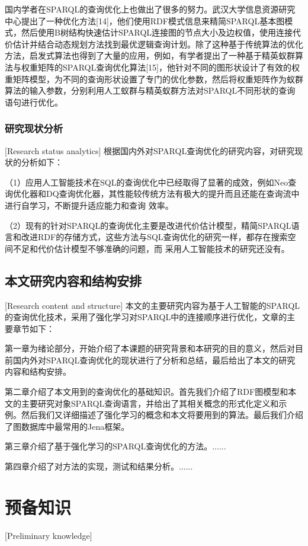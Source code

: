 国内学者在SPARQL的查询优化上也做出了很多的努力。武汉大学信息资源研究中心提出了一种优化方法[14]，他们使用RDF模式信息来精简SPARQL基本图模式，然后使用B树结构快速估计SPARQL连接图的节点大小及边权值，使用连接代价估计并结合动态规划方法找到最优逻辑查询计划。除了这种基于传统算法的优化方法，启发式算法也得到了大量的应用，例如，有学者提出了一种基于精英蚁群算法与权重矩阵的SPARQL查询优化算法[15]，他针对不同的图形状设计了有效的权重矩阵模型，为不同的查询形状设置了专门的优化参数，然后将权重矩阵作为蚁群算法的输入参数，分别利用人工蚁群与精英蚁群方法对SPARQL不同形状的查询语句进行优化。

\subsection{研究现状分析}[Research status analytics]
根据国内外对SPARQL查询优化的研究内容，对研究现状的分析如下：

（1）应用人工智能技术在SQL的查询优化中已经取得了显著的成效，例如Neo查询优化器和DQ查询优化器，其性能较传统方法有极大的提升而且还能在查询流中进行自学习，不断提升适应能力和查询
效率。

（2）现有的针对SPARQL的查询优化主要是改进代价估计模型，精简SPARQL语言和改进RDF的存储方式，这些方法与SQL查询优化的研究一样，都存在搜索空间不足和代价估计模型不够准确的问题，而
采用人工智能技术的研究还没有。


\section{本文研究内容和结构安排}[Research content and structure]
本文的主要研究内容为基于人工智能的SPARQL的查询优化技术，采用了强化学习对SPARQL中的连接顺序进行优化，文章的主要章节如下：

第一章为绪论部分，开始介绍了本课题的研究背景和本研究的目的意义，然后对目前国内外对SPARQL查询优化的现状进行了分析和总结，最后给出了本文的研究内容和结构安排。

第二章介绍了本文用到的查询优化的基础知识。首先我们介绍了RDF图模型和本文的主要研究对象SPARQL查询语言，并给出了其相关概念的形式化定义和示例。然后我们又详细描述了强化学习的概念和本文将要用到的算法。最后我们介绍了图数据库中最常用的Jena框架。

第三章介绍了基于强化学习的SPARQL查询优化的方法。......

第四章介绍了对方法的实现，测试和结果分析。......

\chapter{预备知识}[Preliminary knowledge]

